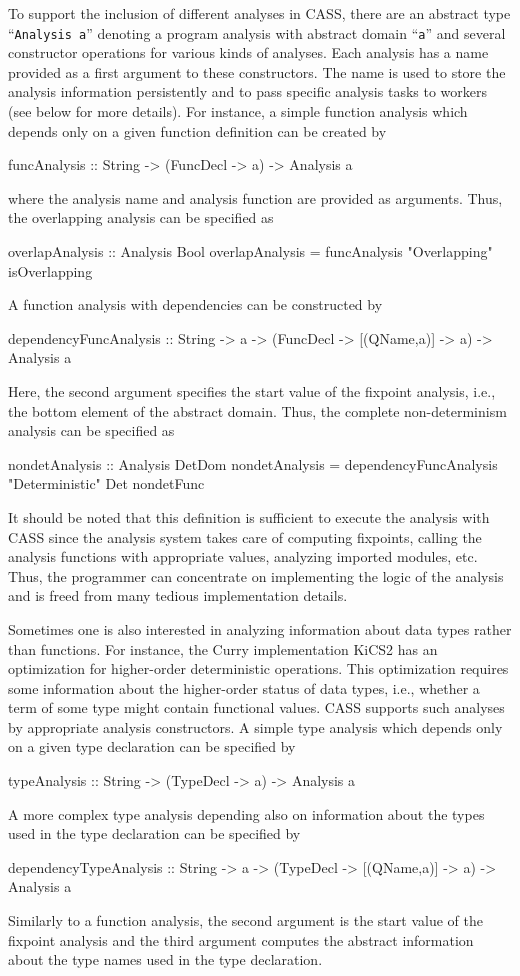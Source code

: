 \documentclass{llncs}
\newcommand{\code}[1]{\mbox{\small\texttt{#1}}}
\newcommand{\ccode}[1]{``\code{#1}''}
\begin{document}
To support the inclusion of different analyses in CASS,
there are an abstract type
\ccode{Analysis a}
denoting a program analysis with abstract domain \ccode{a}
and several constructor operations for various kinds of analyses.
Each analysis has a name provided as a first argument
to these constructors. The name is used to store the
analysis information persistently and to pass specific analysis tasks
to workers (see below for more details).
For instance, a simple function analysis which depends only on a
given function definition can be created by
\begin{curry}
funcAnalysis :: String -> (FuncDecl -> a) -> Analysis a
\end{curry}
where the analysis name and analysis function are provided as arguments.
Thus, the overlapping analysis can be specified as
\begin{curry}
overlapAnalysis :: Analysis Bool
overlapAnalysis = funcAnalysis "Overlapping" isOverlapping
\end{curry}
A function analysis with dependencies can be constructed by
\begin{curry}
dependencyFuncAnalysis ::
  String -> a -> (FuncDecl -> [(QName,a)] -> a) -> Analysis a
\end{curry}
Here, the second argument specifies the start value of the fixpoint analysis,
i.e., the bottom element of the abstract domain.
Thus, the complete non-determinism analysis can be specified as
\begin{curry}
nondetAnalysis :: Analysis DetDom
nondetAnalysis = dependencyFuncAnalysis "Deterministic" Det nondetFunc
\end{curry}
It should be noted that this definition is sufficient to execute the analysis
with CASS since the analysis system takes care of computing fixpoints,
calling the analysis functions with appropriate values,
analyzing imported modules, etc.
Thus, the programmer can concentrate on implementing
the logic of the analysis and is freed from many tedious implementation
details.

Sometimes one is also interested in analyzing information about
data types rather than functions.
For instance, the Curry implementation
KiCS2 \cite{BrasselHanusPeemoellerReck11} has an optimization
for higher-order deterministic operations.
This optimization requires some information about the
higher-order status of data types, i.e., whether a term of some type
might contain functional values.
CASS supports such analyses by appropriate analysis constructors.
A simple type analysis which depends only on a given
type declaration can be specified by
\begin{curry}
typeAnalysis :: String -> (TypeDecl -> a) -> Analysis a
\end{curry}
A more complex type analysis depending also on information
about the types used in the type declaration can be specified by
\begin{curry}
dependencyTypeAnalysis ::
  String -> a -> (TypeDecl -> [(QName,a)] -> a) -> Analysis a
\end{curry}
Similarly to a function analysis, the second argument is the start value
of the fixpoint analysis and the third argument computes
the abstract information about the type names used in the type declaration.
\end{document}
